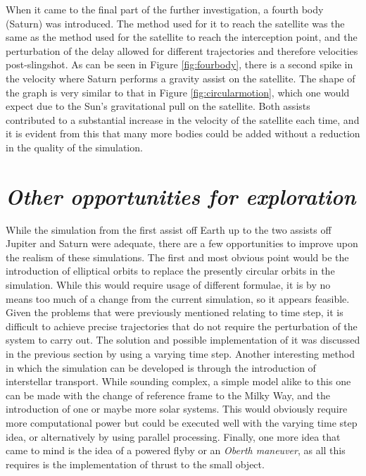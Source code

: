 \documentclass[11pt, english]{report}
\begin{document}
{When it came to the final part of the further investigation, a fourth body (Saturn) was introduced. The method used for it to reach the satellite was the same as the method used for the satellite to reach the interception point, and the perturbation of the delay allowed for different trajectories and therefore velocities post-slingshot. As can be seen in Figure \ref{fig:fourbody}, there is a second spike in the velocity where Saturn performs a gravity assist on the satellite. The shape of the graph is very similar to that in Figure \ref{fig:circularmotion}, which one would expect due to the Sun's gravitational pull on the satellite. Both assists contributed to a substantial increase in the velocity of the satellite each time, and it is evident from this that many more bodies could be added without a reduction in the quality of the simulation.
}

\section{\textsl{Other opportunities for exploration}}
\normalsize{\noindent While the simulation from the first assist off Earth up to the two assists off Jupiter and Saturn were adequate, there are a few opportunities to improve upon the realism of these simulations. The first and most obvious point would be the introduction of elliptical orbits to replace the presently circular orbits in the simulation. While this would require usage of different formulae, it is by no means too much of a change from the current simulation, so it appears feasible. Given the problems that were previously mentioned relating to time step, it is difficult to achieve precise trajectories that do not require the perturbation of the system to carry out. The solution and possible implementation of it was discussed in the previous section by using a varying time step. Another interesting method in which the simulation can be developed is through the introduction of interstellar transport. While sounding complex, a simple model alike to this one can be made with the change of reference frame to the Milky Way, and the introduction of one or maybe more solar systems. This would obviously require more computational power but could be executed well with the varying time step idea, or alternatively by using parallel processing. Finally, one more idea that came to mind is the idea of a powered flyby or an \emph{Oberth maneuver}, as all this requires is the implementation of thrust to the small object. }

%
\end{document}
